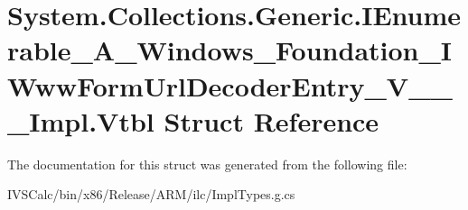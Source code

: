 \hypertarget{struct_system_1_1_collections_1_1_generic_1_1_i_enumerable___a___windows___foundation___i_www_fofa1ef5800e837f9f2addb8f09bd1c84c}{}\section{System.\+Collections.\+Generic.\+I\+Enumerable\+\_\+\+A\+\_\+\+Windows\+\_\+\+Foundation\+\_\+\+I\+Www\+Form\+Url\+Decoder\+Entry\+\_\+\+V\+\_\+\+\_\+\+\_\+\+Impl.\+Vtbl Struct Reference}
\label{struct_system_1_1_collections_1_1_generic_1_1_i_enumerable___a___windows___foundation___i_www_fofa1ef5800e837f9f2addb8f09bd1c84c}


The documentation for this struct was generated from the following file\+:\begin{DoxyCompactItemize}
\item 
I\+V\+S\+Calc/bin/x86/\+Release/\+A\+R\+M/ilc/Impl\+Types.\+g.\+cs\end{DoxyCompactItemize}
